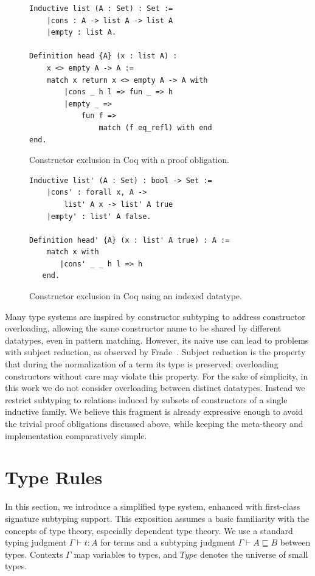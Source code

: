 \documentclass[a4paper, anonymous, UKenglish,cleveref, autoref, thm-restate]{lipics-v2021}
\begin{document}
\begin{figure}
\begin{lstlisting}[language=Coq]
Inductive list (A : Set) : Set :=
    |cons : A -> list A -> list A
    |empty : list A.

Definition head {A} (x : list A) : 
    x <> empty A -> A := 
    match x return x <> empty A -> A with
        |cons _ h l => fun _ => h
        |empty _ => 
            fun f => 
                match (f eq_refl) with end
end.
\end{lstlisting}
\caption{Constructor exclusion in Coq with a proof obligation.}
\label{fig:coq-obligation}
\end{figure}

\begin{figure}
\begin{lstlisting}[language=Coq]
Inductive list' (A : Set) : bool -> Set :=
    |cons' : forall x, A -> 
        list' A x -> list' A true
    |empty' : list' A false.

Definition head' {A} (x : list' A true) : A := 
    match x with
       |cons' _ _ h l => h
   end.
\end{lstlisting}
\caption{Constructor exclusion in Coq using an indexed datatype.}
\label{fig:coq-indexed}
\end{figure}

Many type systems are inspired by constructor subtyping to address constructor overloading, allowing the same constructor name to be shared by different datatypes, even in pattern matching. However, its naive use can lead to problems with subject reduction, as observed by Frade~\cite{mariaJoaoFrade}. Subject reduction is the property that during the normalization of a term its type is preserved; overloading constructors without care may violate this property. For the sake of simplicity, in this work we do not consider overloading between distinct datatypes. Instead we restrict subtyping to relations induced by subsets of constructors of a single inductive family. We believe this fragment is already expressive enough to avoid the trivial proof obligations discussed above, while keeping the meta-theory and implementation comparatively simple.

\section{Type Rules}
\label{sec:rules}
In this section, we introduce a simplified type system, enhanced with first-class signature subtyping support. This exposition assumes a basic familiarity with the concepts of type theory, especially dependent type theory. We use a standard typing judgment $\Gamma \vdash t : A$ for terms and a subtyping judgment $\Gamma \vdash A \sqsubseteq B$ between types. Contexts $\Gamma$ map variables to types, and $Type$ denotes the universe of small types.
\end{document}
